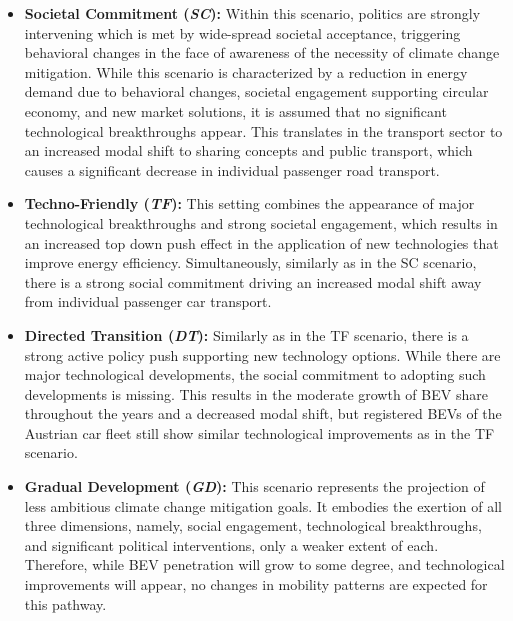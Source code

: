 \documentclass[journal,article,submit,pdftex,moreauthors]{Definitions/mdpi}
\begin{document}
    \begin{itemize}
        \item \textbf{Societal Commitment (\textit{SC}):} Within this scenario, politics are strongly intervening  which is met by wide-spread societal acceptance, triggering behavioral changes in the face of awareness of the necessity of climate change mitigation. While this scenario is characterized by a reduction in energy demand due to behavioral changes, societal engagement supporting circular economy, and new market solutions, it is assumed that no significant technological breakthroughs appear. This translates in the transport sector to an increased modal shift to sharing concepts and public transport, which causes a significant decrease in individual passenger road transport.
        \item \textbf{Techno-Friendly (\textit{TF}):} This setting combines the appearance of major technological breakthroughs and strong societal engagement, which results in an increased top down push effect in the application of new technologies that improve energy efficiency. Simultaneously, similarly as in the SC scenario, there is a strong social commitment driving an increased modal shift away from individual passenger car transport. 
        \item \textbf{Directed Transition (\textit{DT}):} Similarly as in the TF scenario, there is a strong active policy push  supporting new technology options. While there are major technological developments, the social commitment to adopting such developments is missing. This results in the moderate growth of BEV share throughout the years and a decreased modal shift, but registered BEVs of the Austrian car fleet still show similar technological improvements as in the TF scenario.
        \item \textbf{Gradual Development (\textit{GD}):} This scenario represents the projection of less ambitious climate change mitigation goals. It embodies the exertion of all three dimensions, namely, social engagement, technological breakthroughs, and significant political interventions, only a weaker extent of each. Therefore, while BEV penetration will grow to some degree, and technological improvements will appear, no changes in mobility patterns are expected for this pathway.  
    \end{itemize}
    
\end{document}
